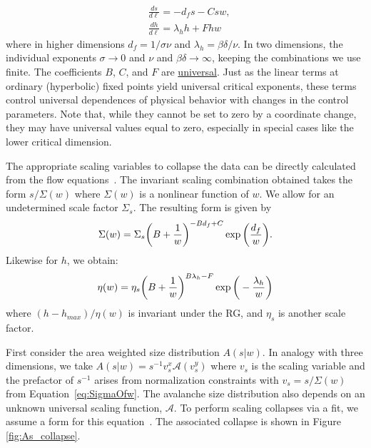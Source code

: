 \documentclass[reprint,amsmath,amssymb,aps,floatfix, prl]{revtex4-1}
\begin{document}
%
\begin{equation}
	\begin{split}
		&\frac{ds}{d\ell}= -d_f s-C s w ,\\ 
		&\frac{dh}{d\ell}= \lambda_h h+F h w
	\end{split}
\end{equation}
%
\noindent where in higher dimensions $d_f = 1/\sigma \nu$ and $\lambda_h = \beta \delta / \nu$. In two dimensions, the individual exponents $\sigma \to 0$ and
$\nu$ and $\beta \delta \to \infty$, keeping the combinations we use finite.  The coefficients $B$, $C$, and $F$ are \underline{universal}. Just as the linear terms at ordinary (hyperbolic) fixed points yield universal critical exponents, these terms control universal dependences of physical behavior with changes in the control parameters. Note that, while they cannot be set to zero by a coordinate change, they may have universal values equal to zero, especially in special cases like the lower critical dimension.\par
%
The appropriate scaling variables to collapse the data can be directly calculated from the flow equations~\cite[Section~\ref{supp-app:truncated}]{RFIM2Dsupp}. The invariant scaling combination obtained takes the form $s/\Sigma(w)$ where $\Sigma(w)$ is a nonlinear function of $w$. We allow for an undetermined scale factor $\Sigma_s$. The resulting form is given by 
%
\begin{equation}
 	\label{eq:SigmaOfw}
	\Sigma(w) = \Sigma_s \bigg{(}B+\frac{1}{w}\bigg{)}^{-B d_f+C}\exp \bigg{(}\frac{d_f}{w}\bigg{)} .
\end{equation}
%
\noindent Likewise for $h$, we obtain:
%
\begin{equation}
 	\label{eq:etaOfw}
	\eta(w) = \eta_s\bigg{(}B+\frac{1}{w}\bigg{)}^{B \lambda_h-F}\exp \bigg{(}-\frac{\lambda_h}{w}\bigg{)}
\end{equation}
%
\noindent where $(h-h_{max})/\eta(w)$ is invariant under the RG, and $\eta_s$ is another scale factor. \par
%
First consider the area weighted size distribution $A(s|w)$. In analogy with three dimensions, we take $A(s|w) = s^{-1}v_s^x \mathcal{A}(v_s^y)$ where $v_s$ is the scaling variable and the prefactor of $s^{-1}$ arises from normalization constraints with $v_s=s/\Sigma(w)$ from Equation~\ref{eq:SigmaOfw}. The avalanche size distribution also depends on an unknown universal scaling function, $\mathcal{A}$. To perform scaling collapses via a fit, we assume a form for this equation~\cite[Section~\ref{supp-app:universal}]{RFIM2Dsupp}. The associated collapse is shown in Figure \ref{fig:As_collapse}. \par
\end{document}
